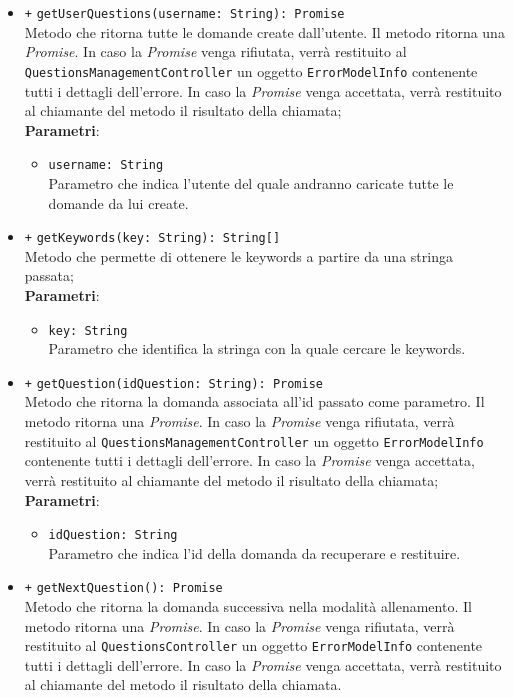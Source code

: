 \begin{itemize}
\begin{itemize}
		\item \texttt{+} \texttt{getUserQuestions(username: String): Promise} \\Metodo che ritorna tutte le domande create dall'utente. Il metodo ritorna una \textit{Promise}. In caso la \textit{Promise} venga rifiutata, verrà restituito al \\ \texttt{QuestionsManagementController} un oggetto \texttt{ErrorModelInfo} contenente tutti i dettagli dell'errore. In caso la \textit{Promise} venga accettata, verrà restituito al chiamante del metodo il risultato della chiamata;\\
		\textbf{Parametri}:
		\begin{itemize}
			\item \texttt{username: String} \\ Parametro che indica l'utente del quale andranno caricate tutte le domande da lui create.
		\end{itemize}
		\item \texttt{+} \texttt{getKeywords(key: String): String[]}\\ Metodo che permette di ottenere le keywords a partire da una stringa passata;\\
		\textbf{Parametri}:
		\begin{itemize}
			\item \texttt{key: String} \\ Parametro che identifica la stringa con la quale cercare le keywords.
		\end{itemize}
		\item \texttt{+} \texttt{getQuestion(idQuestion: String): Promise} \\ Metodo che ritorna la domanda associata all'id passato come parametro. Il metodo ritorna una \textit{Promise}. In caso la \textit{Promise} venga rifiutata, verrà restituito al \texttt{QuestionsManagementController} un oggetto \texttt{ErrorModelInfo} contenente tutti i dettagli dell'errore. In caso la \textit{Promise} venga accettata, verrà restituito al chiamante del metodo il risultato della chiamata;\\
		\textbf{Parametri}:
		\begin{itemize}
			\item \texttt{idQuestion: String} \\ Parametro che indica l'id della domanda da recuperare e restituire.
		\end{itemize}
		\item \texttt{+} \texttt{getNextQuestion(): Promise} \\ Metodo che ritorna la domanda successiva nella modalità allenamento. Il metodo ritorna una \textit{Promise}. In caso la \textit{Promise} venga rifiutata, verrà restituito al \texttt{QuestionsController} un oggetto \texttt{ErrorModelInfo} contenente tutti i dettagli dell'errore. In caso la \textit{Promise} venga accettata, verrà restituito al chiamante del metodo il risultato della chiamata.
	\end{itemize}
\end{itemize}